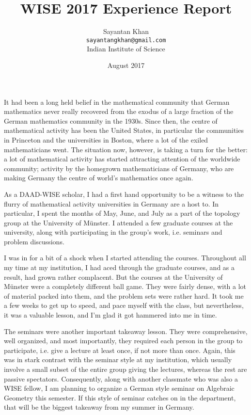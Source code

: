 \documentclass[12pt, notitlepage]{article}
\title{WISE 2017 Experience Report}
\author{Sayantan Khan \\ \texttt{sayantangkhan@gmail.com} \\ Indian Institute of Science}
\date{August 2017}
\begin{document}
\maketitle

It had been a long held belief in the mathematical community that German mathematics
never really recovered from the exodus of a large fraction of the German mathematics
community in the 1930s. Since then, the centre of mathematical activity has been the United
States, in particular the communities in Princeton and the universities in Boston,
where a lot of the exiled mathematicians went. The situation now, however, is taking
a turn for the better: a lot of mathematical activity has started attracting attention
of the worldwide community; activity by the homegrown mathematicians of Germany, who
are making Germany the centre of world's mathematics once again.

As a DAAD-WISE scholar, I had a first hand opportunity to be a witness to the flurry
of mathematical activity universities in Germany are a host to. In particular, I spent
the months of May, June, and July as a part of the topology group at the University of
Münster. I attended a few graduate courses at the university, along with participating
in the group's work, i.e. seminars and problem discussions.

I was in for a bit of a shock when I started attending the courses. Throughout all my time
at my institution, I had aced through the graduate courses, and as a result, had grown rather
complacent. But the courses at the University of Münster were a completely different ball game.
They were fairly dense, with a lot of material packed into them, and the problem sets were rather
hard. It took me a few weeks to get up to speed, and pace myself with the class, but nevertheless,
it was a valuable lesson, and I'm glad it got hammered into me in time.

The seminars were another important takeaway lesson. They were comprehensive, well organized, and most
importantly, they required each person in the group to participate, i.e. give a lecture at least once,
if not more than once. Again, this was in stark contrast with the seminar style at my institution, which
usually involve a small subset of the entire group giving the lectures, whereas the rest are passive
spectators. Consequently, along with another classmate who was also a WISE fellow, I am planning to
organize a German style seminar on Algebraic Geometry this semester. If this style of seminar
catches on in the department, that will be the biggest takeaway from my summer in Germany.
\end{document}
